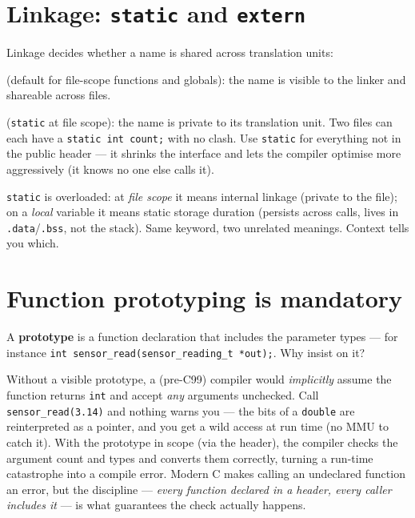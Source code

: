 \documentclass[11pt,a4paper,oneside]{book}
\newcommand{\code}[1]{\texttt{#1}}
\begin{document}
\section{Linkage: \texttt{static} and \texttt{extern}}
Linkage decides whether a name is shared across translation units:
\begin{description}[leftmargin=1.6cm,style=nextline]
  \item[external linkage] (default for file-scope functions and globals): the
        name is visible to the linker and shareable across files.
  \item[internal linkage] (\code{static} at file scope): the name is private to
        its translation unit. Two files can each have a \code{static int count;}
        with no clash. Use \code{static} for everything not in the public
        header --- it shrinks the interface and lets the compiler optimise more
        aggressively (it knows no one else calls it).
\end{description}
\begin{warning}
\code{static} is overloaded: at \emph{file scope} it means internal linkage
(private to the file); on a \emph{local} variable it means static storage
duration (persists across calls, lives in \code{.data}/\code{.bss}, not the
stack). Same keyword, two unrelated meanings. Context tells you which.
\end{warning}

\section{Function prototyping is mandatory}
A \textbf{prototype} is a function declaration that includes the parameter
types --- for instance \code{int sensor\_read(\allowbreak sensor\_reading\_t
*out);}. Why insist on it?

Without a visible prototype, a (pre-C99) compiler would \emph{implicitly} assume
the function returns \code{int} and accept \emph{any} arguments unchecked. Call
\code{sensor\_read(3.14)} and nothing warns you --- the bits of a \code{double}
are reinterpreted as a pointer, and you get a wild access at run time (no MMU to
catch it). With the prototype in scope (via the header), the compiler checks the
argument count and types and converts them correctly, turning a run-time
catastrophe into a compile error. Modern C makes calling an undeclared function
an error, but the discipline --- \emph{every function declared in a header,
every caller includes it} --- is what guarantees the check actually happens.
\end{document}

